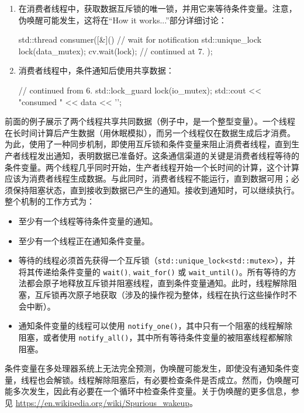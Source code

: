 \begin{enumerate}
\item
在消费者线程中，获取数据互斥锁的唯一锁，并用它来等待条件变量。注意，伪唤醒可能发生，这将在“How it works...”部分详细讨论：

\begin{cpp}
std::thread consumer([&](){
    // wait for notification
    {
        std::unique_lock lock(data_mutex);
        cv.wait(lock);
    }
    // continued at 7.
});
\end{cpp}

\item
消费者线程中，条件通知后使用共享数据：

\begin{cpp}
// continued from 6.
{
    std::lock_guard lock(io_mutex);
    std::cout << "consumed " << data << '\n';
}
\end{cpp}
\end{enumerate}


前面的例子展示了两个线程共享共同数据（例子中，是一个整型变量）。一个线程在长时间计算后产生数据（用休眠模拟），而另一个线程仅在数据生成后才消费。为此，使用了一种同步机制，即使用互斥锁和条件变量来阻止消费者线程，直到生产者线程发出通知，表明数据已准备好。这条通信渠道的关键是消费者线程等待的条件变量。两个线程几乎同时开始，生产者线程开始一个长时间的计算，这个计算应该为消费者线程生成数据。与此同时，消费者线程不能运行，直到数据可用；必须保持阻塞状态，直到接收到数据已产生的通知。接收到通知时，可以继续执行。整个机制的工作方式为：

\begin{itemize}
\item
至少有一个线程等待条件变量的通知。

\item
至少有一个线程正在通知条件变量。

\item
等待的线程必须首先获得一个互斥锁（\verb|std::unique_lock<std::mutex>|），并将其传递给条件变量的 \verb|wait()|, \verb|wait_for()| 或 \verb|wait_until()|。所有等待的方法都会原子地释放互斥锁并阻塞线程，直到条件变量通知。此时，线程解除阻塞，互斥锁再次原子地获取（涉及的操作视为整体，线程在执行这些操作时不会中断）。

\item
通知条件变量的线程可以使用 \verb|notify_one()|，其中只有一个阻塞的线程解除阻塞，或者使用 \verb|notify_all()|，其中所有等待条件变量的被阻塞线程都解除阻塞。
\end{itemize}

\begin{myNotic}
条件变量在多处理器系统上无法完全预测，伪唤醒可能发生，即使没有通知条件变量，线程也会解锁。线程解除阻塞后，有必要检查条件是否成立。然而，伪唤醒可能多次发生，因此有必要在一个循环中检查条件变量。关于伪唤醒的更多信息，参见 \url{https://en.wikipedia.org/wiki/Spurious_wakeup}。
\end{myNotic}

